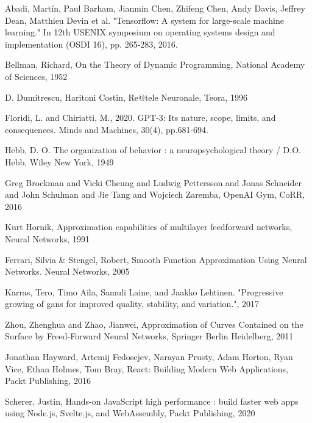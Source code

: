 


\begin{thebibliography}{99}

 Abadi, Martín, Paul Barham, Jianmin Chen, Zhifeng Chen, Andy Davis, Jeffrey Dean, Matthieu Devin et al. "Tensorflow: A system for large-scale machine learning." In 12th {USENIX} symposium on operating systems design and implementation ({OSDI} 16), pp. 265-283, 2016.

 Bellman, Richard, On the Theory of Dynamic Programming, National Academy of Sciences, 1952

 D. Dumitrescu, Haritoni Costin, Re@tele Neuronale, Teora, 1996

 Floridi, L. and Chiriatti, M., 2020. GPT-3: Its nature, scope, limits, and consequences. Minds and Machines, 30(4), pp.681-694.

 Hebb, D. O.  The organization of behavior : a neuropsychological theory / D.O. Hebb, Wiley New York, 1949

 Greg Brockman and Vicki Cheung and Ludwig Pettersson and Jonas Schneider and John Schulman and Jie Tang and Wojciech Zaremba, OpenAI Gym, CoRR, 2016

 Kurt Hornik, Approximation capabilities of multilayer feedforward networks, Neural Networks, 1991

	Ferrari, Silvia \& Stengel, Robert, Smooth Function Approximation Using Neural Networks. Neural Networks, 2005 

 Karras, Tero, Timo Aila, Samuli Laine, and Jaakko Lehtinen. "Progressive growing of gans for improved quality, stability, and variation.", 2017

 Zhou, Zhenghua and Zhao, Jianwei, Approximation of Curves Contained on the Surface by Freed-Forward Neural Networks, Springer Berlin Heidelberg, 2011

 Jonathan Hayward, Artemij Fedosejev, Narayan Prusty, Adam Horton, Ryan Vice, Ethan Holmes, Tom Bray, React: Building Modern Web Applications, Packt Publishing, 2016

 Scherer, Justin, Hands-on JavaScript high performance : build faster web apps using Node.js, Svelte.js, and WebAssembly, Packt Publishing, 2020


\end{thebibliography}
